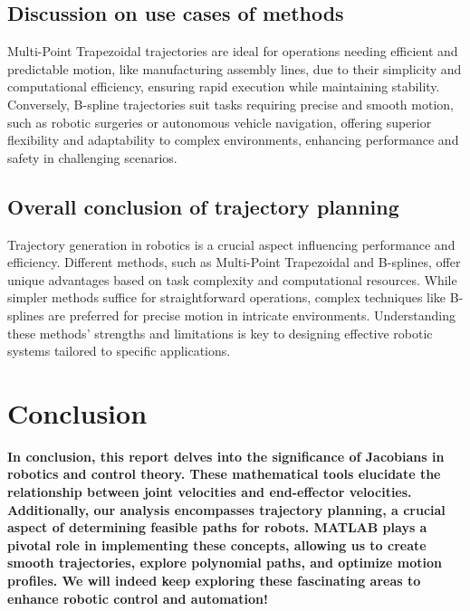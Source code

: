 \documentclass[conference]{IEEEtran}
\begin{document}
\subsection{Discussion on use cases of methods}
Multi-Point Trapezoidal trajectories are ideal for operations needing efficient and predictable motion, like manufacturing assembly lines, due to their simplicity and computational efficiency, ensuring rapid execution while maintaining stability. Conversely, B-spline trajectories suit tasks requiring precise and smooth motion, such as robotic surgeries or autonomous vehicle navigation, offering superior flexibility and adaptability to complex environments, enhancing performance and safety in challenging scenarios.

\subsection{Overall conclusion of trajectory planning}
Trajectory generation in robotics is a crucial aspect influencing performance and efficiency. Different methods, such as Multi-Point Trapezoidal and B-splines, offer unique advantages based on task complexity and computational resources. While simpler methods suffice for straightforward operations, complex techniques like B-splines are preferred for precise motion in intricate environments. Understanding these methods' strengths and limitations is key to designing effective robotic systems tailored to specific applications.

\vspace{50px}
\section{Conclusion}
\textbf{
    In conclusion, this report delves into the significance of Jacobians in robotics and control theory. These mathematical tools elucidate the relationship between joint velocities and end-effector velocities. Additionally, our analysis encompasses trajectory planning, a crucial aspect of determining feasible paths for robots. MATLAB plays a pivotal role in implementing these concepts, allowing us to create smooth trajectories, explore polynomial paths, and optimize motion profiles. We will indeed keep exploring these fascinating areas to enhance robotic control and automation!
}
\vspace{20px}
\end{document}
